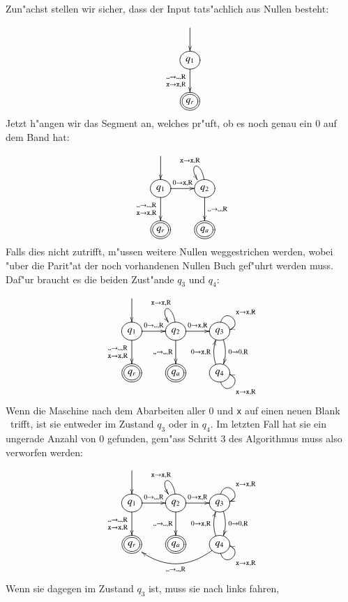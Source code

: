 Zun"achst stellen wir sicher, dass der Input tats"achlich aus Nullen
besteht:
\[
\entrymodifiers={++[o][F]}
\xymatrix{
*+\txt{}\ar[d]
\\
{q_1}\ar[d]_{\genfrac{}{}{0pt}{1}{\blank\to\blank,\text{R}}{{\tt x}\to{\tt x},\text{R}}}
\\
*++[o][F=]{q_r}
}
\]
Jetzt h"angen wir das Segment an, welches pr"uft, ob es noch genau ein $0$
auf dem Band hat:
\[
\entrymodifiers={++[o][F]}
\xymatrix{
*+\txt{}\ar[d]
\\
{q_1}\ar[d]_{\genfrac{}{}{0pt}{1}{\blank\to\blank,\text{R}}{{\tt x}\to{\tt x},\text{R}}}
	\ar[r]^{0\to{\tt x},\text{R}}
	&{q_2}\ar[d]^{\blank\to\blank,\text{R}}
              \ar@(u,ul)_{{\tt x}\to {\tt x},\text{R}}
\\
*++[o][F=]{q_r}
	&*++[o][F=]{q_a}
}
\]
Falls dies nicht zutrifft, m"ussen weitere Nullen weggestrichen werden,
wobei "uber die Parit"at der noch vorhandenen Nullen Buch gef"uhrt werden
muss. Daf"ur braucht es die beiden Zust"ande $q_3$ und $q_4$:
\[
\entrymodifiers={++[o][F]}
\xymatrix{
*+\txt{}\ar[d]
\\
{q_1}\ar[d]_{\genfrac{}{}{0pt}{1}{\blank\to\blank,\text{R}}{{\tt x}\to{\tt x},\text{R}}}
	\ar[r]^{0\to\blank,\text{R}}
	&{q_2}\ar[d]_{\blank\to\blank,\text{R}}
	      \ar[r]^{0\to{\tt x},\text{R}}
              \ar@(u,ul)_{{\tt x}\to {\tt x},\text{R}}
		&{q_3}\ar@(u,r)^{{\tt x}\to{\tt x},\text{R}}
		      \ar@/^/[d]^{0\to 0,\text{R}}
\\
*++[o][F=]{q_r}
	&*++[o][F=]{q_a}
		&{q_4}\ar@/^/[u]^{0\to {\tt x},\text{R}}
		      \ar@(d,r)_{{\tt x}\to{\tt x},\text{R}}
}
\]
Wenn die Maschine nach dem Abarbeiten aller 0 und {\tt x} auf einen
neuen Blank \textvisiblespace\ trifft, ist sie entweder im Zustand
$q_3$ oder in $q_4$. Im letzten Fall hat sie ein ungerade Anzahl
von 0 gefunden, gem"ass Schritt 3 des Algorithmus muss also verworfen
werden:
\[
\entrymodifiers={++[o][F]}
\xymatrix{
*+\txt{}\ar[d]
\\
{q_1}\ar[d]_{\genfrac{}{}{0pt}{1}{\blank\to\blank,\text{R}}{{\tt x}\to{\tt x},\text{R}}}
	\ar[r]^{0\to\blank,\text{R}}
	&{q_2}\ar[d]_{\blank\to\blank,\text{R}}
	      \ar[r]^{0\to{\tt x},\text{R}}
              \ar@(u,ul)_{{\tt x}\to {\tt x},\text{R}}
		&{q_3}\ar@(u,r)^{{\tt x}\to{\tt x},\text{R}}
		      \ar@/^/[d]^{0\to 0,\text{R}}
\\
*++[o][F=]{q_r}
	&*++[o][F=]{q_a}
		&{q_4}\ar@/^/[u]^{0\to {\tt x},\text{R}}
		      \ar@(d,r)_{{\tt x}\to{\tt x},\text{R}}
		      \ar@/^20pt/[ll]^{\blank\to\blank,\text{R}}
}
\]
Wenn sie dagegen im Zustand $q_3$ ist, muss sie nach links fahren,
